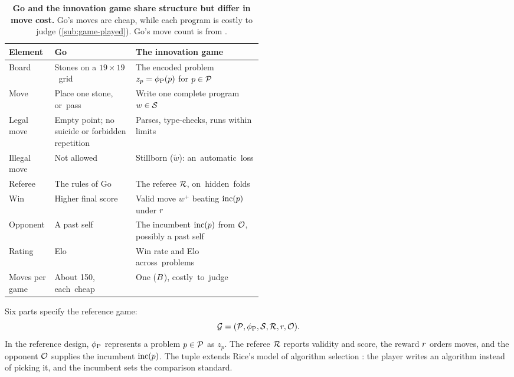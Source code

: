 \begin{table}[htb]
  \caption{\textbf{Go and the innovation game share structure but differ in move cost.}
  Go's moves are cheap, while each program is costly to judge
  (\cref{sub:game-played}). Go's move count is
  from \citet{silver2016mastering}.}
  \label{tab:go-vs-innovation}
  \centering
  \small
  \setlength{\tabcolsep}{4pt}
  \setlength{\extrarowheight}{2pt}%
  \begin{tabularx}{\linewidth}{@{}>{\raggedright\arraybackslash}p{0.18\linewidth}>{\raggedright\arraybackslash}p{0.32\linewidth}>{\raggedright\arraybackslash}X@{}}
    \toprule
    Element        & Go                              & The innovation game \\
    \midrule
    Board          & Stones on a \mbox{$19\times19$ grid} & The encoded problem $z_p = \phi_{\mathrm{P}}(p)$ for $p \in \mathcal{P}$ \\
    Move           & Place one stone, \mbox{or pass} & Write one complete \mbox{program $w \in \mathcal{S}$} \\
    Legal move     & Empty point; no suicide or forbidden repetition & Parses, type-checks, runs within limits \\
    Illegal move   & Not allowed                     & Stillborn ($\tilde{w}$): \mbox{an automatic loss} \\
    Referee        & The rules of Go                 & The referee $\mathcal{R}$, \mbox{on hidden folds} \\
    Win            & Higher final score             & Valid move $w^+$ beating $\mathrm{inc}(p)$ under $r$ \\
    Opponent       & A past self                     & The incumbent $\mathrm{inc}(p)$ from $\mathcal{O}$, possibly a past self \\
    Rating         & Elo                             & Win rate and Elo \mbox{across problems} \\
    Moves per game & About 150, \mbox{each cheap}    & One ($B$), \mbox{costly to judge} \\
    \bottomrule
  \end{tabularx}
\end{table}

Six parts specify the reference game:
\[
  \mathcal{G} = (\mathcal{P}, \phi_{\mathrm{P}}, \mathcal{S}, \mathcal{R}, r, \mathcal{O}).
\]
In the reference design, $\phi_{\mathrm{P}}$ represents a problem $p \in \mathcal{P}$ as
$z_p$. The referee $\mathcal{R}$ reports validity and score, the
%
%
reward $r$ orders moves, and the opponent $\mathcal{O}$ supplies the
incumbent $\mathrm{inc}(p)$. The tuple extends Rice's model of algorithm
selection \citep{rice1976algorithm}: the player writes an algorithm instead of
\mbox{picking} it, and the incumbent sets the comparison standard.

